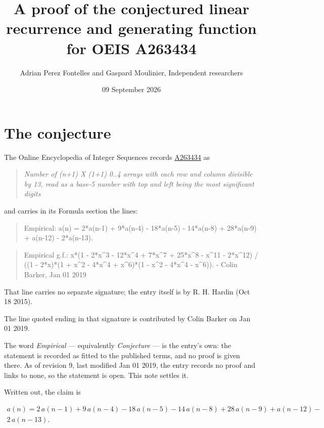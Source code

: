 \documentclass[11pt]{article}
\title{A proof of the conjectured linear recurrence and generating function for OEIS A263434}
\author{Adrian Perez Fontelles and Gaspard Moulinier, Independent researchers}
\date{09 September 2026}
\theoremstyle{definition}
\begin{document}
\maketitle
\section{The conjecture}

The Online Encyclopedia of Integer Sequences records \href{https://oeis.org/A263434}{A263434} as

\begin{quote}\itshape Number of (n+1) X (1+1) 0..4 arrays with each row and column divisible by 13, read as a base-5 number with top and left being the most significant digits\end{quote}

and carries in its Formula section the lines:

\begin{quote}\ttfamily Empirical: a(n) = 2*a(n-1) + 9*a(n-4) - 18*a(n-5) - 14*a(n-8) + 28*a(n-9) + a(n-12) - 2*a(n-13).\end{quote}

\begin{quote}\ttfamily Empirical g.f.: x*(1 - 2*x\textasciicircum{}3 - 12*x\textasciicircum{}4 + 7*x\textasciicircum{}7 + 25*x\textasciicircum{}8 - x\textasciicircum{}11 - 2*x\textasciicircum{}12) / ((1 - 2*x)*(1 + x\textasciicircum{}2 - 4*x\textasciicircum{}4 + x\textasciicircum{}6)*(1 - x\textasciicircum{}2 - 4*x\textasciicircum{}4 - x\textasciicircum{}6)). - Colin Barker, Jan 01 2019\end{quote}

That line carries no separate signature; the entry itself is by R. H. Hardin (Oct 18 2015).

The line quoted ending in that signature is contributed by Colin Barker on Jan 01 2019.

The word {\itshape Empirical} --- equivalently {\itshape Conjecture} --- is the entry's own: the statement is recorded as fitted to the published terms, and no proof is given there. As of revision 9, last modified Jan 01 2019, the entry records no proof and links to none, so the statement is open. This note settles it.

Written out, the claim is

\begin{multline*} a(n) = 2\,a(n-1) + 9\,a(n-4) - 18\,a(n-5) - 14\,a(n-8) + 28\,a(n-9) + a(n-12) - \\ 2\,a(n-13). \end{multline*}
\end{document}
